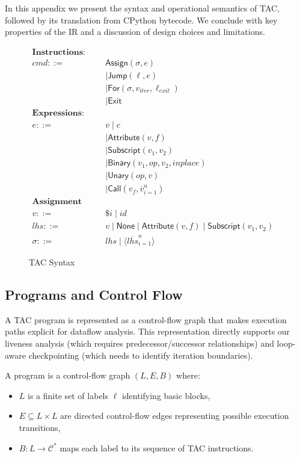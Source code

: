 In this appendix we present the syntax and operational semantics of TAC, followed by its translation from CPython bytecode.  
We conclude with key properties of the IR and a discussion of design choices and limitations.


\begin{figure}[t]
\centering
\[
\begin{aligned}
\textbf{Instructions:} && \\
cmd ::= \;& \mathsf{Assign}(\sigma, e) \\
      &\mid \mathsf{Jump}(\ell, e) \\
      &\mid \mathsf{For}(\sigma, v_{\mathit{iter}}, \ell_{\mathit{exit}}) \\
      &\mid \mathsf{Exit} \\[1ex]
\textbf{Expressions:} && \\
e ::= \;& v \mid c \\
 &\mid \mathsf{Attribute}(v,f) \\
 &\mid \mathsf{Subscript}(v_1,v_2) \\
 &\mid \mathsf{Binary}(v_1,op,v_2,inplace) \\
 &\mid \mathsf{Unary}(op,v) \\
 &\mid \mathsf{Call}(v_f, \overline{v}_{i=1}^{n}) \\[1ex]
\textbf{Assignment Targets:} && \\
v ::= \;& \mathsf{\$}i \mid id \\
lhs ::= \;& v \mid \mathsf{None} \mid \mathsf{Attribute}(v,f) \mid \mathsf{Subscript}(v_1,v_2) \\
\sigma ::= \;& lhs \mid \langle\overline{lhs}_{i=1}^{n}\rangle
\end{aligned}
\]
\caption{TAC Syntax}
\label{fig:tac-syntax}
\end{figure}

\subsection{Programs and Control Flow}

A TAC program is represented as a control-flow graph that makes execution paths explicit for dataflow analysis. This representation directly supports our liveness analysis (which requires predecessor/successor relationships) and loop-aware checkpointing (which needs to identify iteration boundaries).

A program is a control-flow graph $(L,E,B)$ where:
\begin{itemize}
\item $L$ is a finite set of labels $\ell$ identifying basic blocks,
\item $E \subseteq L \times L$ are directed control-flow edges representing possible execution transitions,
\item $B : L \to \mathcal{C}^*$ maps each label to its sequence of TAC instructions.
\end{itemize}

